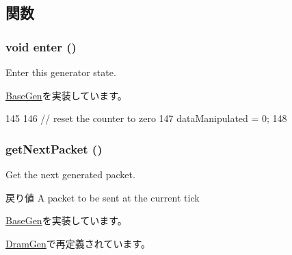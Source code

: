 \subsection{関数}
\hypertarget{classRandomGen_a2759dad6560aaf485b16356d7142d69d}{
\subsubsection[{enter}]{\setlength{\rightskip}{0pt plus 5cm}void enter ()}}
\label{classRandomGen_a2759dad6560aaf485b16356d7142d69d}
Enter this generator state. 

\hyperlink{classBaseGen_ac51895063c53dfbc0f47a01940a3aa05}{BaseGen}を実装しています。


\begin{DoxyCode}
145 {
146     // reset the counter to zero
147     dataManipulated = 0;
148 }
\end{DoxyCode}
\hypertarget{classRandomGen_a938aa9841a9a62a776afbd0768af5379}{
\subsubsection[{getNextPacket}]{ getNextPacket ()}}
\label{classRandomGen_a938aa9841a9a62a776afbd0768af5379}
Get the next generated packet.

\begin{DoxyReturn}{戻り値}
A packet to be sent at the current tick 
\end{DoxyReturn}


\hyperlink{classBaseGen_a6cdb7c977e91dfc33aeea10a3dfcefed}{BaseGen}を実装しています。

\hyperlink{classDramGen_a938aa9841a9a62a776afbd0768af5379}{DramGen}で再定義されています。


